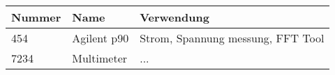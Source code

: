 
\begin{tabular}{ l | l | l }
  \hline 
  Nummer & Name & Verwendung \\
  \hline \hline
  454 & Agilent p90 & Strom, Spannung messung, FFT Tool  \\
  \hline
  7234 & Multimeter & ... \\  
  \hline
\end{tabular}